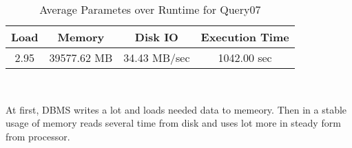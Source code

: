 \documentclass[../../main.tex]{subfiles}
\begin{document}
    \begin{table}
        \begin{center}
            \begin{tabular}{ |c|c|c|c| } 
            \hline
            Load & Memory & Disk IO & Execution Time\\
            \hline
            2.95 & 39577.62 MB & 34.43 MB/sec & 1042.00 sec \\
            \hline
            \end{tabular}
            \\[1pt]
            \caption{Average Parametes over Runtime for Query07}
        \end{center}
    \end{table}
    At first, DBMS writes a lot and loads needed data to memeory. Then in a stable usage of memory reads several time from disk and uses lot more in steady form from processor.
    \pagebreak
\end{document}
